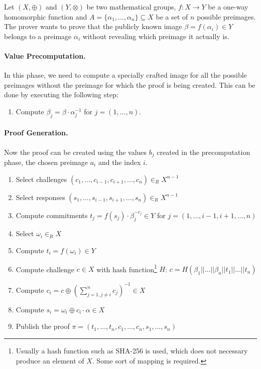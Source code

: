 \documentclass[numbers=noenddot, abstract=on, a4paper, headsepline,
footsepline, oneside, openright, draft=off, listof=leveldown]{scrreprt}
\begin{document}
Let $(X,\oplus)$ and $(Y,\otimes)$ be two mathematical groups, $f:X \rightarrow
Y$ be a one-way homomorphic function and $A=\{\alpha_1,\ldots,\alpha_n\} \subseteq X$
be a set of $n$ possible preimages. The prover wants to prove that the publicly known
image $\beta=f(\alpha_i) \in Y$ belongs to a preimage $\alpha_i$ without
revealing which preimage it actually is. 

\paragraph{Value Precomputation.} In this phase, we need to compute a specially
crafted image for all the possible preimages without the preimage for which the
proof is being created. This can be done by executing the following step:

\begin{enumerate}
  \item Compute $\beta_j = \beta \cdot \alpha_j^{-1}$ for $j=(1,...,n)$.
\end{enumerate}
 
\paragraph{Proof Generation.} Now the proof can be created using the
values $b_j$ created in the precomputation phase, the chosen preimage $a_i$ and
the index $i$.
 
\begin{enumerate}  
  \item Select challenges $(c_1, \ldots, c_{i-1}, c_{i+1}, \ldots, c_n) \in_R
  X^{n-1}$
  \item Select responses $(s_1, \ldots, s_{i-1}, s_{i+1}, \ldots, s_n) \in_R
  X^{n-1}$
  \item Compute commitments $t_j=f(s_j) \cdot \beta_j^{-c_j} \in Y$ for
  $j=(1, \ldots, i-1, i+1, \ldots, n)$
  \item Select $\omega_i \in_R X$
  \item Compute $t_i=f(\omega_i) \in Y$
  \item Compute challenge $c\in X$ with hash function\footnote{Usually a
  hash function such as SHA-256 is used, which does not necessary produce an
  element of $X$. Some sort of mapping is required.} $H$:
  $c=H(\beta_1||\ldots||\beta_n||t_1||\ldots||t_n)$
  \item Compute $c_i=c\oplus(\sum_{j=1, j \neq i}^n c_j)^{-1} \in X$
  \item Compute $s_i=\omega_i \oplus c_i \cdot \alpha \in X$
  \item Publish the proof $\pi = (t_1,\ldots,t_n,c_1,\ldots,c_n,s_1,\ldots,s_n)$
\end{enumerate}
\end{document}
